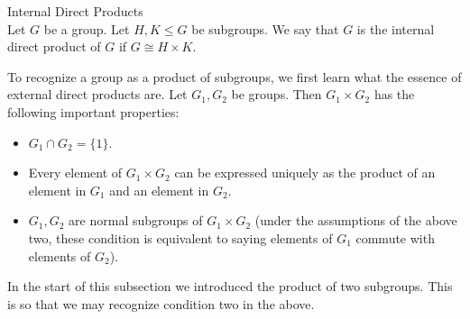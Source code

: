\documentclass[a4paper]{article}
\begin{document}
\begin{defn}{Internal Direct Products}{}\\
Let $G$ be a group. Let $H,K\leq G$ be subgroups. We say that $G$ is the internal direct product of $G$ if $G\cong H\times K$. 
\end{defn}

To recognize a group as a product of subgroups, we first learn what the essence of external direct products are. Let $G_1,G_2$ be groups. Then $G_1\times G_2$ has the following important properties: 
\begin{itemize}
\item $G_1\cap G_2=\{1\}$. 
\item Every element of $G_1\times G_2$ can be expressed uniquely as the product of an element in $G_1$ and an element in $G_2$. 
\item $G_1,G_2$ are normal subgroups of $G_1\times G_2$ (under the assumptions of the above two, these condition is equivalent to saying elements of $G_1$ commute with elements of $G_2$). 
\end{itemize}

In the start of this subsection we introduced the product of two subgroups. This is so that we may recognize condition two in the above. 
\end{document}
